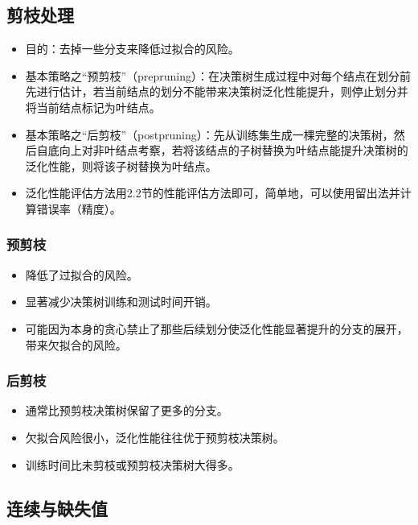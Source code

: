 \documentclass{ctexart}
\begin{document}
				\subsection{剪枝处理}
					\begin{itemize}
						\item 目的：去掉一些分支来降低过拟合的风险。
						\item 基本策略之``预剪枝''（prepruning）：在决策树生成过程中对每个结点在划分前先进行估计，若当前结点的划分不能带来决策树泛化性能提升，则停止划分并将当前结点标记为叶结点。
						\item 基本策略之``后剪枝''（postpruning）：先从训练集生成一棵完整的决策树，然后自底向上对非叶结点考察，若将该结点的子树替换为叶结点能提升决策树的泛化性能，则将该子树替换为叶结点。
						\item 泛化性能评估方法用2.2节的性能评估方法即可，简单地，可以使用留出法并计算错误率（精度）。
					\end{itemize}
					\subsubsection{预剪枝}
						\begin{itemize}
							\item 降低了过拟合的风险。
							\item 显著减少决策树训练和测试时间开销。
							\item 可能因为本身的贪心禁止了那些后续划分使泛化性能显著提升的分支的展开，带来欠拟合的风险。
						\end{itemize}
					\subsubsection{后剪枝}
						\begin{itemize}
							\item 通常比预剪枝决策树保留了更多的分支。
							\item 欠拟合风险很小，泛化性能往往优于预剪枝决策树。
							\item 训练时间比未剪枝或预剪枝决策树大得多。
						\end{itemize}
				\subsection{连续与缺失值}
\end{document}
